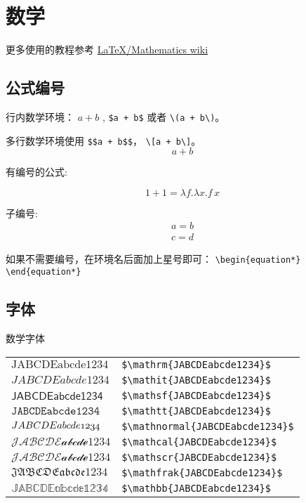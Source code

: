 \documentclass{ctexbook}
\begin{document}
\section{数学}

更多使用的教程参考 \href{https://en.wikibooks.org/wiki/LaTeX/Mathematics}{\LaTeX/Mathematics wiki}

\subsection{公式编号}

行内数学环境： $a + b$ , \verb!$a + b$! 或者 \verb!\(a + b\)!。

多行数学环境使用 \verb!$$a + b$$!，  \verb!\[a + b\]!。
$$a + b$$

有编号的公式:

\begin{equation}\label{euqation:one_plus_one}
    1 + 1 = \lambda f . \lambda x . f\, x
\end{equation}


子编号:
\begin{subequations}
    \begin{eqnarray}
        a = b \\
        c = d
    \end{eqnarray}
\end{subequations}

如果不需要编号，在环境名后面加上星号即可： \verb!\begin{equation*} \end{equation*}!

\subsection{字体}

数学字体

\begin{tabular}{ll}
$\mathrm{JABCDEabcde1234}$      &  \verb!$\mathrm{JABCDEabcde1234}$!     \\
$\mathit{JABCDEabcde1234}$      &  \verb!$\mathit{JABCDEabcde1234}$!     \\
$\mathsf{JABCDEabcde1234}$      &  \verb!$\mathsf{JABCDEabcde1234}$!     \\
$\mathtt{JABCDEabcde1234}$      &  \verb!$\mathtt{JABCDEabcde1234}$!     \\
$\mathnormal{JABCDEabcde1234}$  &  \verb!$\mathnormal{JABCDEabcde1234}$! \\
$\mathcal{JABCDEabcde1234}$     &  \verb!$\mathcal{JABCDEabcde1234}$!    \\
$\mathscr{JABCDEabcde1234}$     &  \verb!$\mathscr{JABCDEabcde1234}$!    \\
$\mathfrak{JABCDEabcde1234}$    &  \verb!$\mathfrak{JABCDEabcde1234}$!   \\
$\mathbb{JABCDEabcde1234}$      &  \verb!$\mathbb{JABCDEabcde1234}$!     \\
\end{tabular}
\end{document}
